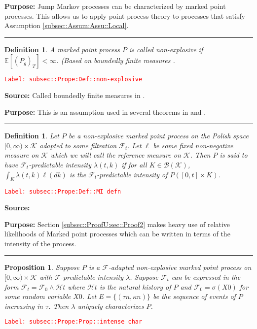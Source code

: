 \documentclass[12pt]{article}
\newcommand{\mb}{\mathbb}
\newcommand{\mc}{\mathcal}
\newcommand{\ms}{\mathscr}
\newcommand{\tr}{\textcolor{red}}
\newcommand{\labe}[1]{\tr{\texttt{Label: #1}}}
\newcommand{\purpose}{\textbf{Purpose: }}
\newcommand{\lin}{\rule{\linewidth}{0.4 pt}}
\newcommand{\ex}[1]{\mb{E}\left[#1\right]}			%
\renewcommand{\t}{t}							%
\newcommand{\F}{\mc{F}}							%
\newcommand{\FH}{\mc{H}}						%
\newcommand{\X}{X}								%
\newcommand{\ts}[1]{_{#1}}						%
\newcommand{\rate}{\lambda}						%
\newcommand{\rt}{\tau}							%
\renewcommand{\mark}{\kappa}					%
\newcommand{\rp}{P}								%
\newcommand{\mspce}{\mc{K}}						%
\newcommand{\rpg}{\rp_g}						%
\newtheorem{prop}[thms]{Proposition}
\newtheorem{defn}[thms]{Definition}
\begin{document}
\purpose Jump Markov processes can be characterized by marked point processes. This allows us to apply point process theory to processes that satisfy Assumption \ref{subsec::Assum:Assu::Local}.

\lin

\begin{defn}
A marked point process \(\rp\) is called non-explosive if \(\ex{(\rpg)_T} < \infty\). (Based on boundedly finite measures \cite[Definition 9.1.I]{DalVer08}.
\label{subsec::Prope:Def::non-explosive}
\end{defn}
\labe{subsec::Prope:Def::non-explosive}

\textbf{Source: } Called boundedly finite measures in \cite[Definition 9.1.I]{DalVer08}.

\purpose This is an assumption used in several theorems in \cite{DalVer03} and \cite{DalVer08}.

\lin

\begin{defn}
Let \(\rp\) be a non-explosive marked point process on the Polish space \([0,\infty)\times \mspce\) adapted to some filtration \(\F\ts{\t}\). Let \(\ell\) be some fixed non-negative measure on \(\mspce\) which we will call the reference measure on \(\mspce\). Then \(\rp\) is said to have \(\F\ts{\t}\)-predictable intensity \(\rate(\t,k)\) if for all \(K \in \ms{B}(\mspce)\), \(\int_K \rate(\t,k)\ell(dk)\) is the \(\F\ts{\t}\)-predictable intensity of \(\rp([0,\t]\times K)\). 
\label{subsec::Prope:Def::MI defn}
\end{defn}
\labe{subsec::Prope:Def::MI defn}

\textbf{Source: }\cite[Definition 14.3.I]{DalVer08}

\purpose Section \ref{subsec::ProofU:sec::Proof2} makes heavy use of relative likelihoods of Marked point processes which can be written in terms of the intensity of the process.

\lin

\begin{prop}
Suppose \(\rp\) is a \(\F\)-adapted non-explosive marked point process on \([0,\infty)\times \mspce\) with \(\F\)-predictable intensity \(\rate\). Suppose \(\F\ts{\t}\) can be expressed in the form \(\F\ts{\t} = \F\ts{0}\wedge \FH{\t}\) where \(\FH{\t}\) is the natural history of \(\rp\) and \(\F\ts{0} = \sigma(\X{}{0})\) for some random variable \(\X{}{0}\). Let \(E = \{(\rt{n},\mark{n})\}\) be the sequence of events of \(\rp\) increasing in \(\rt\). Then \(\rate\) uniquely characterizes \(\rp\).
\label{subsec::Prope:Prop::intense char}
\end{prop}
\labe{subsec::Prope:Prop::intense char}
\end{document}
